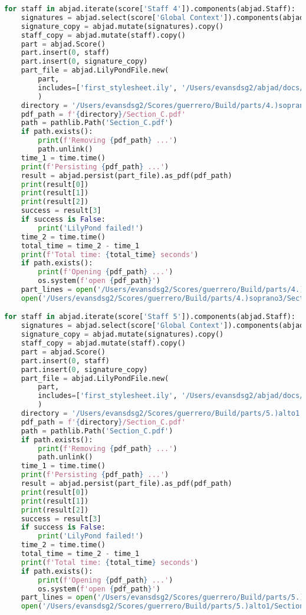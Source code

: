 \begin{lstlisting}[language=Python, caption=Invocation Source Code]
for staff in abjad.iterate(score['Staff 4']).components(abjad.Staff):
    signatures = abjad.select(score['Global Context']).components(abjad.Staff)
    signature_copy = abjad.mutate(signatures).copy()
    staff_copy = abjad.mutate(staff).copy()
    part = abjad.Score()
    part.insert(0, staff)
    part.insert(0, signature_copy)
    part_file = abjad.LilyPondFile.new(
        part,
        includes=['first_stylesheet.ily', '/Users/evansdsg2/abjad/docs/source/_stylesheets/abjad.ily'],
        )
    directory = '/Users/evansdsg2/Scores/guerrero/Build/parts/4.)soprano3'
    pdf_path = f'{directory}/Section_C.pdf'
    path = pathlib.Path('Section_C.pdf')
    if path.exists():
        print(f'Removing {pdf_path} ...')
        path.unlink()
    time_1 = time.time()
    print(f'Persisting {pdf_path} ...')
    result = abjad.persist(part_file).as_pdf(pdf_path)
    print(result[0])
    print(result[1])
    print(result[2])
    success = result[3]
    if success is False:
        print('LilyPond failed!')
    time_2 = time.time()
    total_time = time_2 - time_1
    print(f'Total time: {total_time} seconds')
    if path.exists():
        print(f'Opening {pdf_path} ...')
        os.system(f'open {pdf_path}')
    part_lines = open('/Users/evansdsg2/Scores/guerrero/Build/parts/4.)soprano3/Section_C.ly').readlines()
    open('/Users/evansdsg2/Scores/guerrero/Build/parts/4.)soprano3/Section_C.ly', 'w').writelines(part_lines[15:-1])

for staff in abjad.iterate(score['Staff 5']).components(abjad.Staff):
    signatures = abjad.select(score['Global Context']).components(abjad.Staff)
    signature_copy = abjad.mutate(signatures).copy()
    staff_copy = abjad.mutate(staff).copy()
    part = abjad.Score()
    part.insert(0, staff)
    part.insert(0, signature_copy)
    part_file = abjad.LilyPondFile.new(
        part,
        includes=['first_stylesheet.ily', '/Users/evansdsg2/abjad/docs/source/_stylesheets/abjad.ily'],
        )
    directory = '/Users/evansdsg2/Scores/guerrero/Build/parts/5.)alto1'
    pdf_path = f'{directory}/Section_C.pdf'
    path = pathlib.Path('Section_C.pdf')
    if path.exists():
        print(f'Removing {pdf_path} ...')
        path.unlink()
    time_1 = time.time()
    print(f'Persisting {pdf_path} ...')
    result = abjad.persist(part_file).as_pdf(pdf_path)
    print(result[0])
    print(result[1])
    print(result[2])
    success = result[3]
    if success is False:
        print('LilyPond failed!')
    time_2 = time.time()
    total_time = time_2 - time_1
    print(f'Total time: {total_time} seconds')
    if path.exists():
        print(f'Opening {pdf_path} ...')
        os.system(f'open {pdf_path}')
    part_lines = open('/Users/evansdsg2/Scores/guerrero/Build/parts/5.)alto1/Section_C.ly').readlines()
    open('/Users/evansdsg2/Scores/guerrero/Build/parts/5.)alto1/Section_C.ly', 'w').writelines(part_lines[15:-1])


\end{lstlisting}
